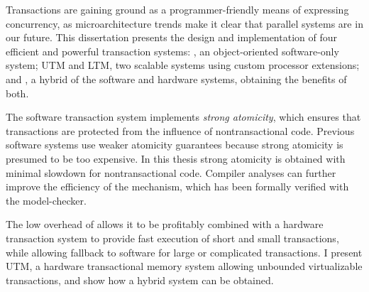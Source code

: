 {\sis

Transactions are gaining ground as a programmer-friendly means of
expressing concurrency, as microarchitecture trends make it
clear that parallel systems are in our future.  This dissertation
presents the design and implementation of four efficient and powerful
transaction systems: \apex, an object-oriented software-only system;
UTM and LTM, two scalable systems using custom processor extensions;
and \hyx, a hybrid of the software and hardware systems,
obtaining the benefits of both.

The software transaction system implements \textit{strong atomicity},
which ensures that transactions are protected from the influence of
nontransactional code.  Previous software systems use weaker
atomicity guarantees because strong atomicity is presumed to be too
expensive.  In this thesis strong atomicity is obtained with
minimal slowdown for nontransactional code.  Compiler analyses can
further improve the efficiency of the mechanism, which has been
formally verified with the \Spin model-checker.

The low overhead of \apex allows it to be profitably
combined with a hardware transaction system to provide fast execution
of short and small transactions, while allowing fallback to software
for large or complicated transactions.  I present UTM, a hardware
transactional memory system allowing unbounded virtualizable
transactions, and show how a hybrid system can be obtained.

}

